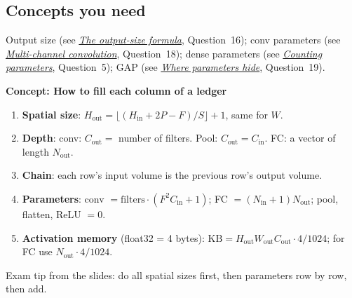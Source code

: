 \documentclass[12pt,a4paper]{article}
\newcommand{\concept}[2]{\par\medskip\phantomsection\label{#1}{\large\bfseries\color{blue!50!black} Concept: #2}\par}
\newcommand{\seeconcept}[3]{(see \hyperref[#1]{\textit{#2}}, Question~#3)}
\begin{document}
\subsection*{Concepts you need}
Output size \seeconcept{c:outsize}{The output-size formula}{16}; conv parameters \seeconcept{c:multichannel}{Multi-channel convolution}{18}; dense parameters \seeconcept{c:paramcount}{Counting parameters}{5}; GAP \seeconcept{c:gap}{Where parameters hide}{19}.

\concept{c:ledger}{How to fill each column of a ledger}
\begin{enumerate}[nosep]
\item \textbf{Spatial size}: $H_{\text{out}}=\lfloor(H_{\text{in}}+2P-F)/S\rfloor+1$, same for $W$.
\item \textbf{Depth}: conv: $C_{\text{out}}=$ number of filters. Pool: $C_{\text{out}}=C_{\text{in}}$. FC: a vector of length $N_{\text{out}}$.
\item \textbf{Chain}: each row's input volume is the previous row's output volume.
\item \textbf{Parameters}: conv $=\text{filters}\cdot(F^2C_{\text{in}}+1)$; FC $=(N_{\text{in}}+1)N_{\text{out}}$; pool, flatten, ReLU $=0$.
\item \textbf{Activation memory} (float32 = 4 bytes): $\text{KB}=H_{\text{out}}W_{\text{out}}C_{\text{out}}\cdot4/1024$; for FC use $N_{\text{out}}\cdot4/1024$.
\end{enumerate}
Exam tip from the slides: do all spatial sizes first, then parameters row by row, then add.
\end{document}
